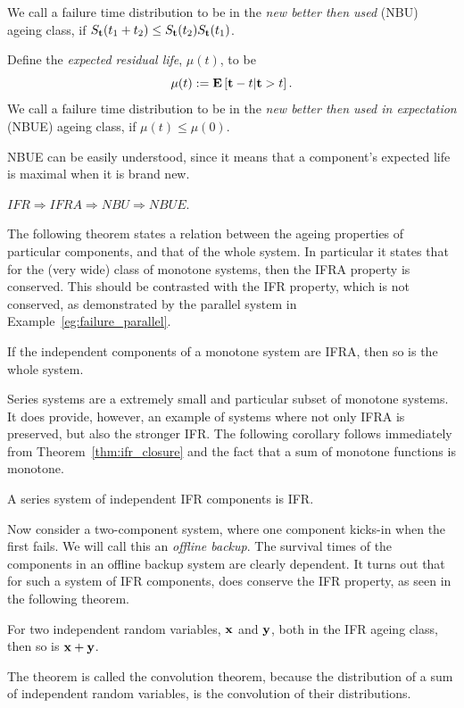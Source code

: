 \begin{definition}[NBU]
We call a failure time distribution to be in the \emph{new better then used} (NBU) ageing class, if 
$S_{\mathbf{t}} (t_1+t_2) \leq S_{\mathbf{t}} (t_2) S_{\mathbf{t}} (t_1)$.
\end{definition}


\begin{definition}[NBUE]
Define the \emph{expected residual life}, $\mu(t)$, to be 
$$\mu(t):= \mathbf{E}\left[ \mathbf{t}-t|\mathbf{t}>t \right].$$
We call a failure time distribution to be in the \emph{new better then used in expectation} (NBUE) ageing class, if 
$\mu(t) \leq \mu(0)$.
\end{definition}
NBUE can be easily understood, since it means that a component's expected life is maximal when it is brand new. 


\begin{theorem}
$IFR \Rightarrow IFRA \Rightarrow NBU \Rightarrow NBUE. $
\end{theorem}


The following theorem states a relation between the ageing properties of particular components, and that of the whole system. In particular it states that for the (very wide) class of monotone systems, then the IFRA property is conserved. 
This should be contrasted with the IFR property, which is not conserved, as demonstrated by the parallel system in  Example~\ref{eg:failure_parallel}.
\begin{theorem}
\label{thm:ifra_closure}
If the independent components of a monotone system are IFRA, then so is the whole system.
\end{theorem}


Series systems are a extremely small and particular subset of monotone systems.
It does provide, however, an example of systems where not only IFRA is preserved, but also the stronger IFR.
The following corollary follows immediately from Theorem~\ref{thm:ifr_closure} and the fact that a sum of monotone functions is monotone.
\begin{cor}
\label{cor:ifr_series}
A series system of independent IFR components is IFR.
\end{cor}




Now consider a two-component system, where one component kicks-in when the first fails.
We will call this an \emph{offline backup}.
The survival times of the components in an offline backup system are clearly dependent. 
It turns out that for such a system of IFR components, does conserve the IFR property, as seen in the following theorem.
\begin{theorem}
\label{thm:ifr_convolution}
For two independent random variables, $\mathbf{x}$ and $\mathbf{y}$, both in the IFR ageing class, then so is $\mathbf{x}+\mathbf{y}$.
\end{theorem}
The theorem is called the convolution theorem, because the distribution of a sum of independent random variables, is the convolution of their distributions.


